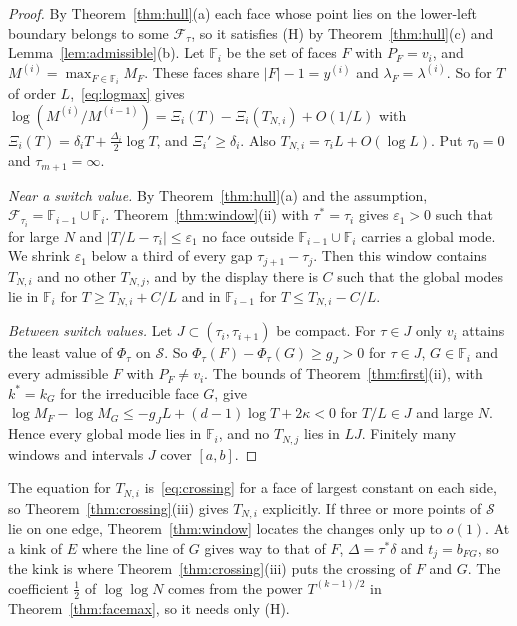 \begin{proof}
By Theorem~\ref{thm:hull}(a) each face whose point lies on the lower-left boundary belongs to
some $\mathcal F_\tau$, so it satisfies (H) by Theorem~\ref{thm:hull}(c) and
Lemma~\ref{lem:admissible}(b). Let $\mathbb F_i$ be the set of faces $F$ with $P_F=v_i$, and
$M^{(i)}=\max_{F\in\mathbb F_i}M_F$. These faces share $|F|-1=y^{(i)}$ and
$\lambda_F=\lambda^{(i)}$. So for $T$ of order $L$,~\eqref{eq:logmax} gives
$\log(M^{(i)}/M^{(i-1)})=\Xi_i(T)-\Xi_i(T_{N,i})+O(1/L)$ with
$\Xi_i(T)=\delta_iT+\frac{\Delta_i}2\log T$, and $\Xi_i'\ge\delta_i$. Also
$T_{N,i}=\tau_iL+O(\log L)$. Put $\tau_0=0$ and $\tau_{m+1}=\infty$.

\emph{Near a switch value.} By Theorem~\ref{thm:hull}(a) and the assumption,
$\mathcal F_{\tau_i}=\mathbb F_{i-1}\cup\mathbb F_i$. Theorem~\ref{thm:window}(ii) with
$\tau^*=\tau_i$ gives $\varepsilon_1>0$ such that for large $N$ and $|T/L-\tau_i|\le\varepsilon_1$
no face outside $\mathbb F_{i-1}\cup\mathbb F_i$ carries a global mode. We shrink
$\varepsilon_1$ below a third of every gap $\tau_{j+1}-\tau_j$. Then this window contains
$T_{N,i}$ and no other $T_{N,j}$, and by the display there is $C$ such that the global modes lie
in $\mathbb F_i$ for $T\ge T_{N,i}+C/L$ and in $\mathbb F_{i-1}$ for $T\le T_{N,i}-C/L$.

\emph{Between switch values.} Let $J\subset(\tau_i,\tau_{i+1})$ be compact. For $\tau\in J$ only
$v_i$ attains the least value of $\Phi_\tau$ on $\mathcal S$. So $\Phi_\tau(F)-\Phi_\tau(G)\ge g_J>0$
for $\tau\in J$, $G\in\mathbb F_i$ and every admissible $F$ with $P_F\ne v_i$. The bounds of
Theorem~\ref{thm:first}(ii), with $k^*=k_G$ for the irreducible face $G$, give
$\log M_F-\log M_G\le-g_JL+(d-1)\log T+2\kappa<0$ for $T/L\in J$ and large $N$. Hence every
global mode lies in $\mathbb F_i$, and no $T_{N,j}$ lies in $LJ$. Finitely many windows and
intervals $J$ cover $[a,b]$.
\end{proof}

The equation for $T_{N,i}$ is~\eqref{eq:crossing} for a face of largest constant on each side,
so Theorem~\ref{thm:crossing}(iii) gives $T_{N,i}$ explicitly. If three or more points of
$\mathcal S$ lie on one edge, Theorem~\ref{thm:window} locates the changes only up to $o(1)$. At a
kink of $E$ where the line of $G$ gives way to that of $F$, $\Delta=\tau^*\delta$ and
$t_j=b_{FG}$, so the kink is where Theorem~\ref{thm:crossing}(iii) puts the crossing of $F$ and
$G$. The coefficient $\frac12$ of $\log\log N$ comes from the power $T^{(k-1)/2}$ in
Theorem~\ref{thm:facemax}, so it needs only (H).

